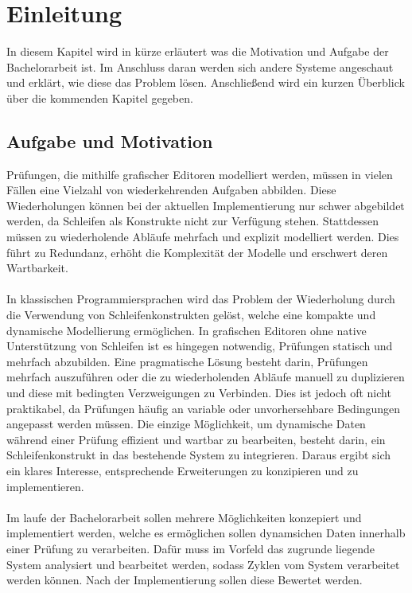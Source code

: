 \documentclass{article}
\begin{document}
    \newpage
    \tableofcontents
    \newpage
    \section{Einleitung}
    In diesem Kapitel wird in kürze erläutert was die Motivation und Aufgabe der Bachelorarbeit ist.
    Im Anschluss daran werden sich andere Systeme angeschaut und erklärt, wie diese das Problem lösen.
    Anschließend wird ein kurzen Überblick über die kommenden Kapitel gegeben.
    \subsection{Aufgabe und Motivation}
    Prüfungen, die mithilfe grafischer Editoren modelliert werden, müssen in vielen Fällen eine Vielzahl von wiederkehrenden Aufgaben abbilden. 
    Diese Wiederholungen können bei der aktuellen Implementierung nur schwer abgebildet werden, da Schleifen als Konstrukte nicht zur Verfügung stehen. 
    Stattdessen müssen zu wiederholende Abläufe mehrfach und explizit modelliert werden. 
    Dies führt zu Redundanz, erhöht die Komplexität der Modelle und erschwert deren Wartbarkeit.\\
    \\
    In klassischen Programmiersprachen wird das Problem der Wiederholung durch die Verwendung von Schleifenkonstrukten gelöst, welche eine kompakte und dynamische Modellierung ermöglichen. 
    In grafischen Editoren ohne native Unterstützung von Schleifen ist es hingegen notwendig, Prüfungen statisch und mehrfach abzubilden. 
    Eine pragmatische Lösung besteht darin, Prüfungen mehrfach auszuführen oder die zu wiederholenden Abläufe manuell zu duplizieren und diese mit bedingten Verzweigungen zu Verbinden. 
    Dies ist jedoch oft nicht praktikabel, da Prüfungen häufig an variable oder unvorhersehbare Bedingungen angepasst werden müssen.
    Die einzige Möglichkeit, um dynamische Daten während einer Prüfung effizient und wartbar zu bearbeiten, besteht darin, ein Schleifenkonstrukt in das bestehende System zu integrieren. 
    Daraus ergibt sich ein klares Interesse, entsprechende Erweiterungen zu konzipieren und zu implementieren.\\
    \\
    Im laufe der Bachelorarbeit sollen mehrere Möglichkeiten konzepiert und implementiert werden, welche es ermöglichen sollen dynamsichen Daten innerhalb einer Prüfung zu verarbeiten. 
    Dafür muss im Vorfeld das zugrunde liegende System analysiert und bearbeitet werden, sodass Zyklen vom System verarbeitet werden können.
    Nach der Implementierung sollen diese Bewertet werden.
\end{document}
